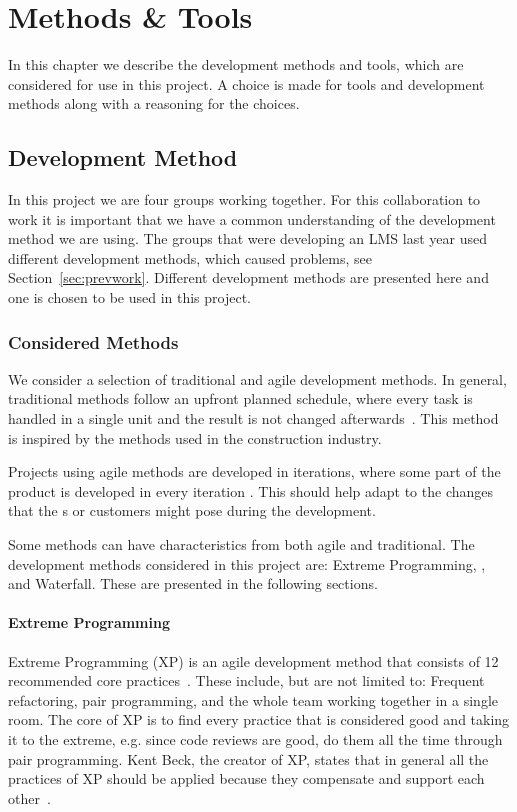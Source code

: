 \chapter{Methods \& Tools}
In this chapter we describe the development methods and tools, which are considered for use in this project.
A choice is made for tools and development methods along with a reasoning for the choices.

\section{Development Method}
\label{sec:devMethod}
In this project we are four groups working together.
For this collaboration to work it is important that we have a common understanding of the development method we are using.
The groups that were developing an LMS last year used different development methods, which caused problems, see Section~\ref{sec:prevwork}.
Different development methods are presented here and one is chosen to be used in this project.

\subsection{Considered Methods}
We consider a selection of traditional and agile development methods.
In general, traditional methods follow an upfront planned schedule, where every task is handled in a single unit and the result is not changed afterwards~\cite[sec.~2.7]{Poppendieck00}.
This method is inspired by the methods used in the construction industry.

Projects using agile methods are developed in iterations, where some part of the product is developed in every iteration \cite[p.~25]{Larman04}.
This should help adapt to the changes that the \euser{}s or customers might pose during the development.

Some methods can have characteristics from both agile and traditional.
The development methods considered in this project are: Extreme Programming, \scrum{}, and Waterfall.
These are presented in the following sections.

\subsubsection{Extreme Programming}
Extreme Programming (XP) is an agile development method that consists of 12 recommended core practices~\cite[p.~137]{Larman04}.
These include, but are not limited to: Frequent refactoring, pair programming, and the whole team working together in a single room.
The core of XP is to find every practice that is considered good and taking it to the extreme, e.g. since code reviews are good, do them all the time through pair programming.
Kent Beck, the creator of XP, states that in general all the practices of XP should be applied because they compensate and support each other~\cite[p.~156-157]{Larman04}.

